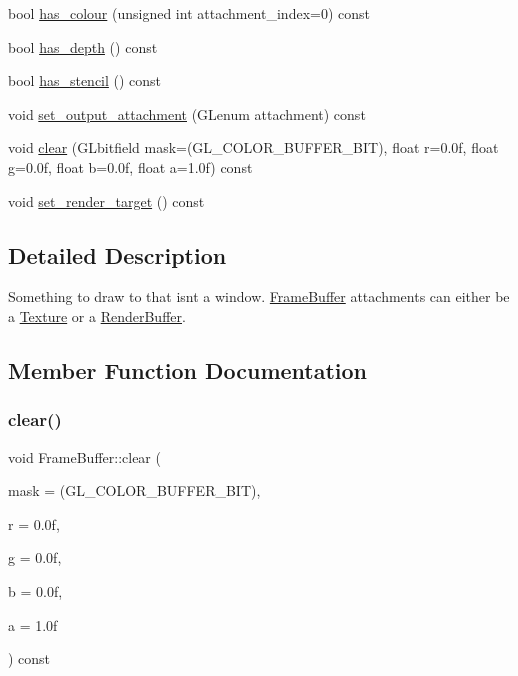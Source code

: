 \begin{DoxyCompactItemize}
\item 
bool \mbox{\hyperlink{class_frame_buffer_ac29ea4f3bed89d0ee1dc68311855caa8}{has\+\_\+colour}} (unsigned int attachment\+\_\+index=0) const
\item 
bool \mbox{\hyperlink{class_frame_buffer_a18d5cd8d11602cdf92e5f657b2879dbd}{has\+\_\+depth}} () const
\item 
bool \mbox{\hyperlink{class_frame_buffer_a335d07f9693a899614ea9349d23b7b0b}{has\+\_\+stencil}} () const
\item 
void \mbox{\hyperlink{class_frame_buffer_a154cadd117fe1a33a131308524394706}{set\+\_\+output\+\_\+attachment}} (G\+Lenum attachment) const
\item 
void \mbox{\hyperlink{class_frame_buffer_a1468a0d96614d4b138b6f9f1669e5034}{clear}} (G\+Lbitfield mask=(G\+L\+\_\+\+C\+O\+L\+O\+R\+\_\+\+B\+U\+F\+F\+E\+R\+\_\+\+B\+IT), float r=0.\+0f, float g=0.\+0f, float b=0.\+0f, float a=1.\+0f) const
\item 
void \mbox{\hyperlink{class_frame_buffer_ace702e593b6724f151b1aa8a5441124a}{set\+\_\+render\+\_\+target}} () const
\end{DoxyCompactItemize}


\subsection{Detailed Description}
Something to draw to that isn\textquotesingle{}t a window. \mbox{\hyperlink{class_frame_buffer}{Frame\+Buffer}} attachments can either be a \mbox{\hyperlink{class_texture}{Texture}} or a \mbox{\hyperlink{class_render_buffer}{Render\+Buffer}}. 

\subsection{Member Function Documentation}
\mbox{\label{class_frame_buffer_a1468a0d96614d4b138b6f9f1669e5034}} 
\subsubsection{\texorpdfstring{clear()}{clear()}}
{\footnotesize\ttfamily void Frame\+Buffer\+::clear (\begin{DoxyParamCaption}\item[{G\+Lbitfield}]{mask = {\ttfamily (GL\+\_\+COLOR\+\_\+BUFFER\+\_\+BIT)},  }\item[{float}]{r = {\ttfamily 0.0f},  }\item[{float}]{g = {\ttfamily 0.0f},  }\item[{float}]{b = {\ttfamily 0.0f},  }\item[{float}]{a = {\ttfamily 1.0f} }\end{DoxyParamCaption}) const}


